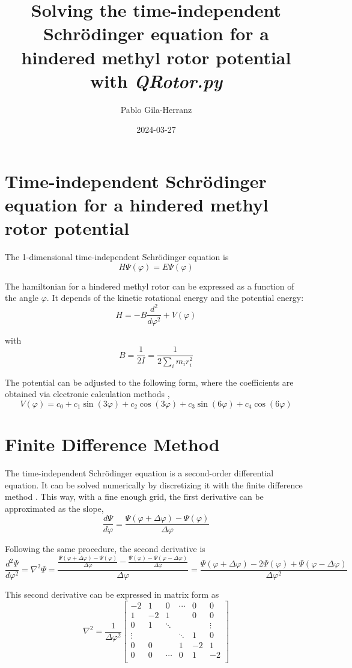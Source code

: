 \documentclass[12pt,a4paper]{article}
\title{Solving the time-independent Schrödinger equation for a hindered methyl rotor potential with \textit{QRotor.py}}
\author{Pablo Gila-Herranz}
\date{2024-03-27}
\begin{document}
\maketitle


\section*{Time-independent Schrödinger equation for a hindered methyl rotor potential}

The 1-dimensional time-independent Schrödinger equation is
$$
H\Psi(\varphi)=E\Psi(\varphi)
$$

The hamiltonian for a hindered methyl rotor can be expressed as a function of the angle $\varphi$.
It depends of the kinetic rotational energy and the potential energy:
$$
H = -B \frac{d^2}{d\varphi^2} + V(\varphi)
$$

with
$$
B = \frac{1}{2I}=\frac{1}{2\sum_{i}m_{i}r_{i}^{2}}
$$

The potential can be adjusted to the following form, where the coefficients are obtained via electronic calculation methods \cite{titov2023},
$$
V(\varphi)=c_{0}+c_{1}\sin(3\varphi)+c_{2}\cos(3\varphi)+c_{3}\sin(6\varphi)+c_{4}\cos(6\varphi)
$$


\section*{Finite Difference Method}

The time-independent Schrödinger equation is a second-order differential equation.
It can be solved numerically by discretizing it with the finite difference method \cite{finite_diff_python}.
This way, with a fine enough grid, the first derivative can be approximated as the slope,
$$
\frac{d\Psi}{d\varphi} = \frac{\Psi(\varphi+\Delta\varphi)-\Psi(\varphi)}{\Delta\varphi}
$$

Following the same procedure, the second derivative is
$$
\frac{d^2\Psi}{d\varphi^2} = \nabla^2\Psi = \frac{\frac{\Psi(\varphi+\Delta\varphi)-\Psi(\varphi)}{\Delta\varphi} - \frac{\Psi(\varphi)-\Psi(\varphi-\Delta\varphi)}{\Delta\varphi}}{\Delta\varphi} = \frac{\Psi(\varphi+\Delta\varphi)-2\Psi(\varphi)+\Psi(\varphi-\Delta\varphi)}{\Delta\varphi^2}
$$

This second derivative can be expressed in matrix form as
\[
    \nabla^2 = \frac{1}{\Delta\varphi^2}
    \left[ {\begin{array}{cccccc}
    -2      &  1     &  0     & \cdots &  0    &  0      \\
     1      & -2     &  1     &        &  0    &  0      \\
     0      &  1     & \ddots &        &       &  \vdots \\
     \vdots &        &        & \ddots &  1    &  0      \\
     0      &  0     &        &  1     & -2    &  1      \\
     0      &  0     & \cdots &  0     &  1    & -2      \\
    \end{array} } \right]
\]
\end{document}
